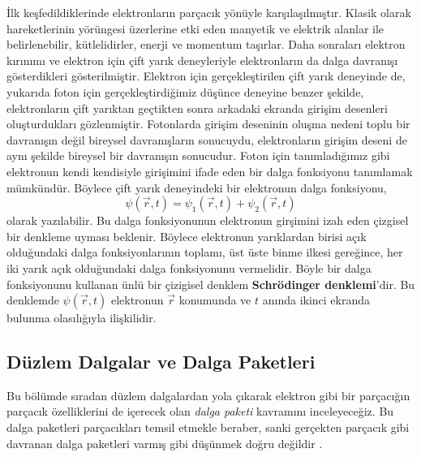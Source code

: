 \documentclass[a4paper,12pt, twoside]{article}
\begin{document}
İlk keşfedildiklerinde elektronların parçacık yönüyle karşılaşılmıştır. Klasik olarak hareketlerinin yörüngesi üzerlerine etki eden manyetik ve elektrik alanlar ile belirlenebilir, kütlelidirler, enerji ve momentum taşırlar. Daha sonraları elektron kırınımı ve elektron için çift yarık deneyleriyle elektronların da dalga davranışı gösterdikleri gösterilmiştir. Elektron için gerçekleştirilen çift yarık deneyinde de, yukarıda foton için gerçekleştirdiğimiz düşünce deneyine benzer şekilde, elektronların çift yarıktan geçtikten sonra arkadaki ekranda girişim desenleri oluşturdukları gözlenmiştir. Fotonlarda girişim deseninin oluşma nedeni toplu bir davranışın değil bireysel davranışların sonucuydu, elektronların girişim deseni de aynı şekilde bireysel bir davranışın sonucudur. Foton için tanımladığımız gibi elektronun kendi kendisiyle girişimini ifade eden bir dalga fonksiyonu tanımlamak mümkündür. Böylece çift yarık deneyindeki bir elektronun dalga fonksiyonu,
\begin{equation}
\psi(\vec r, t) = \psi_1(\vec r, t) + \psi_2(\vec r, t)
\label{eq:single_electron_wave}
\end{equation}
olarak yazılabilir. Bu dalga fonksiyonunun elektronun girşimini izah eden çizgisel bir denkleme uyması beklenir. Böylece elektronun yarıklardan birisi açık olduğundaki dalga fonksiyonlarının toplamı, üst üste binme ilkesi gereğince, her iki yarık açık olduğundaki dalga fonksiyonunu vermelidir. Böyle bir dalga fonksiyonunu kullanan ünlü bir çizigisel denklem {\bf Schrödinger denklemi}'dir. Bu denklemde $\psi (\vec r, t)$ elektronun $\vec r$ konumunda ve $t$ anında ikinci ekranda bulunma olasılığıyla ilişkilidir. 

\subsection{Düzlem Dalgalar ve Dalga Paketleri}

Bu bölümde sıradan düzlem dalgalardan yola çıkarak elektron gibi bir parçacığın parçacık özelliklerini de içerecek olan \emph{dalga paketi} kavramını inceleyeceğiz. Bu dalga paketleri parçacıkları temsil etmekle beraber, sanki gerçekten parçacık gibi davranan dalga paketleri varmış gibi düşünmek doğru değildir \cite{book:Gasiorowicz}.
\end{document}
